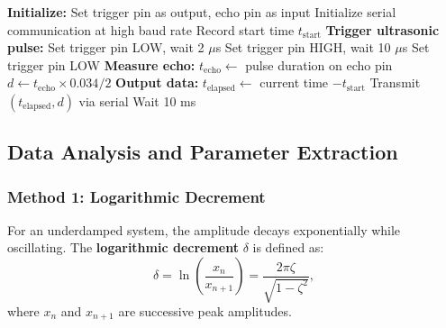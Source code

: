 \begin{algorithm}
\caption{Step Response Data Acquisition}
\label{alg:step_response}
\begin{algorithmic}[1]
\State \textbf{Initialize:}
\State \hspace{1em} Set trigger pin as output, echo pin as input
\State \hspace{1em} Initialize serial communication at high baud rate
\State \hspace{1em} Record start time $t_{\text{start}}$
\State
{}
    \State \textbf{Trigger ultrasonic pulse:}
    \State \hspace{1em} Set trigger pin LOW, wait 2 $\mu$s
    \State \hspace{1em} Set trigger pin HIGH, wait 10 $\mu$s
    \State \hspace{1em} Set trigger pin LOW
    \State
    \State \textbf{Measure echo:}
    \State \hspace{1em} $t_{\text{echo}} \gets$ pulse duration on echo pin
    \State \hspace{1em} $d \gets t_{\text{echo}} \times 0.034 / 2$ 
    \State
    \State \textbf{Output data:}
    \State \hspace{1em} $t_{\text{elapsed}} \gets$ current time $- t_{\text{start}}$
    \State \hspace{1em} Transmit $(t_{\text{elapsed}}, d)$ via serial
    \State
    \State Wait 10 ms 
\EndWhile
\end{algorithmic}
\end{algorithm}

\subsection{Data Analysis and Parameter Extraction}

\subsubsection{Method 1: Logarithmic Decrement}

For an underdamped system, the amplitude decays exponentially while oscillating. The \textbf{logarithmic decrement} $\delta$ is defined as:
\begin{equation}
\delta = \ln\left(\frac{x_n}{x_{n+1}}\right) = \frac{2\pi\zeta}{\sqrt{1-\zeta^2}},
\end{equation}
where $x_n$ and $x_{n+1}$ are successive peak amplitudes.

